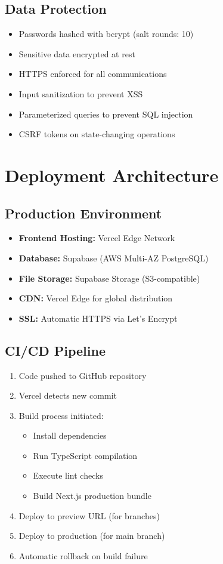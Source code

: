 \subsection{Data Protection}

\begin{itemize}
\item Passwords hashed with bcrypt (salt rounds: 10)
\item Sensitive data encrypted at rest
\item HTTPS enforced for all communications
\item Input sanitization to prevent XSS
\item Parameterized queries to prevent SQL injection
\item CSRF tokens on state-changing operations
\end{itemize}

\section{Deployment Architecture}

\subsection{Production Environment}

\begin{itemize}
\item \textbf{Frontend Hosting:} Vercel Edge Network
\item \textbf{Database:} Supabase (AWS Multi-AZ PostgreSQL)
\item \textbf{File Storage:} Supabase Storage (S3-compatible)
\item \textbf{CDN:} Vercel Edge for global distribution
\item \textbf{SSL:} Automatic HTTPS via Let's Encrypt
\end{itemize}

\subsection{CI/CD Pipeline}

\begin{enumerate}
\item Code pushed to GitHub repository
\item Vercel detects new commit
\item Build process initiated:
    \begin{itemize}
    \item Install dependencies
    \item Run TypeScript compilation
    \item Execute lint checks
    \item Build Next.js production bundle
    \end{itemize}
\item Deploy to preview URL (for branches)
\item Deploy to production (for main branch)
\item Automatic rollback on build failure
\end{enumerate}

